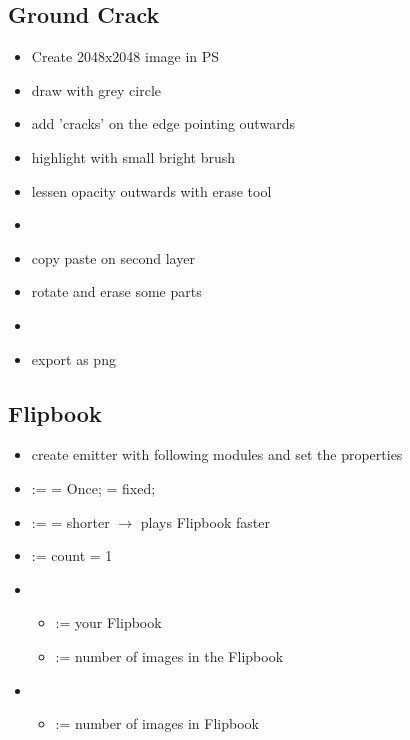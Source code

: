         \subsection{Ground Crack}
            \begin{itemize}
                \item Create 2048x2048 image in PS
                \item draw with grey circle
                \item add 'cracks' on the edge pointing outwards
                \item highlight with small bright brush
                \item lessen opacity outwards with erase tool
                \item 
                \item copy paste on second layer
                \item rotate and erase some parts
                \item 
                \item export as png
            \end{itemize}


        \subsection{Flipbook}
            \begin{itemize}
                \item create emitter with following modules and set the properties
                \item {} :=  = Once;  = fixed;
                \item {} :=  = shorter $\rightarrow$ plays Flipbook faster
                \item {} :=  count = 1
                \item {}
                    \begin{itemize}
                        \item {} := your Flipbook
                        \item {} := number of images in the Flipbook
                    \end{itemize}
                \item {}
                    \begin{itemize}
                        \item {} := number of images in Flipbook
                    \end{itemize}
            \end{itemize}

 
